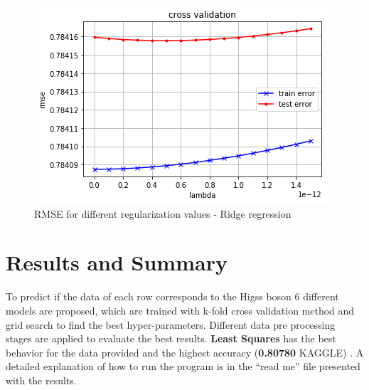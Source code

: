 \documentclass[10pt,conference,compsocconf]{IEEEtran}
\begin{document}
\begin{figure}[H]
  \centering
  \includegraphics[width=\columnwidth]{cross_validation_lambda}
  \caption{RMSE for different regularization values - Ridge regression}
  \vspace{-3mm}
  \label{fig:best_lambda}
\end{figure}



\section{Results and Summary}
To predict if the data of each row corresponds to the Higss boson
6 different models are proposed, which are trained with k-fold cross validation
method and grid search to find the best hyper-parameters. 
Different data pre processing stages are applied to evaluate the best results. 
\textbf{Least Squares} has the best behavior for the data provided and 
the highest accuracy (\textbf{0.80780} KAGGLE) .
A detailed explanation of how to run the program is
in the ``read me'' file presented with the results.




\end{document}
